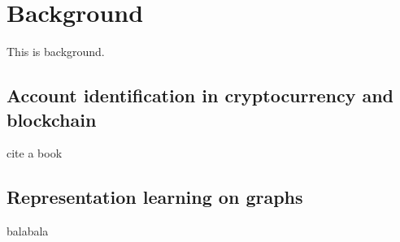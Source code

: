 
\section{Background}
This is background.
\subsection{Account identification in cryptocurrency and blockchain}
cite a book \cite{}
\subsection{Representation learning on graphs}
balabala